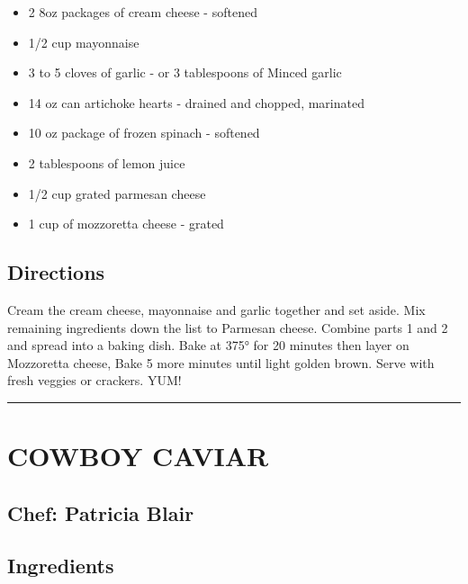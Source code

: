\documentclass[
]{book}
\providecommand{\tightlist}{%
  \setlength{\itemsep}{0pt}\setlength{\parskip}{0pt}}
\begin{document}
\begin{itemize}
\tightlist
\item
  2 8oz packages of cream cheese - softened
\item
  1/2 cup mayonnaise
\item
  3 to 5 cloves of garlic - or 3 tablespoons of Minced garlic
\item
  14 oz can artichoke hearts - drained and chopped, marinated
\item
  10 oz package of frozen spinach - softened
\item
  2 tablespoons of lemon juice
\item
  1/2 cup grated parmesan cheese
\item
  1 cup of mozzoretta cheese - grated
\end{itemize}

\hypertarget{directions}{%
\subsection*{Directions}\label{directions}}


Cream the cream cheese, mayonnaise and garlic together and set aside. Mix remaining ingredients down the list to Parmesan cheese. Combine parts 1 and 2 and spread into a baking dish. Bake at 375° for 20 minutes then layer on Mozzoretta cheese, Bake 5 more minutes until light golden brown. Serve with fresh veggies or crackers. YUM!

\begin{center}\rule{0.5\linewidth}{0.5pt}\end{center}

\hypertarget{cowboy-caviar}{%
\section*{COWBOY CAVIAR}\label{cowboy-caviar}}


\hypertarget{chef-patricia-blair}{%
\subsection*{Chef: Patricia Blair}\label{chef-patricia-blair}}


\hypertarget{ingredients-1}{%
\subsection*{Ingredients}\label{ingredients-1}}
\end{document}
